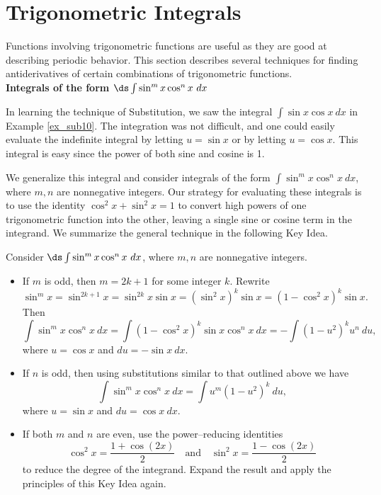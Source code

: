 \pagebreak
\section{Trigonometric Integrals}\label{sec:trigint}
Functions involving trigonometric functions are useful as they are good at describing periodic behavior. %
 This section describes several techniques for finding antiderivatives of certain combinations of trigonometric functions.\\

\noindent\textbf{\large Integrals of the form $\ds \int \sin^m x\cos^n x\ dx$}

In learning the technique of Substitution, we saw the integral $\int \sin x\cos x\ dx$ in Example \ref{ex_sub10}. The integration was not difficult, and one could easily evaluate the indefinite integral by letting $u=\sin x$ or by letting $u = \cos x$. This integral is easy since the power of both sine and cosine is 1.

We generalize this integral and consider integrals of the form $\int \sin^mx\cos^nx\ dx$, where $m,n$ are nonnegative integers. Our strategy for evaluating these integrals is to use the identity $\cos^2x+\sin^2x=1$ to convert high powers of one trigonometric function into the other, leaving a single sine or cosine term in the integrand. We summarize the general technique in the following Key Idea.

\enlargethispage{2\baselineskip}
\setboxwidth{60pt}
\noindent\ifthenelse{\isodd{\thepage}}{}{\hskip -60pt}
\begin{minipage}{\specialboxlength}
{Consider $\ds \int \sin^mx\cos^nx\ dx$, where $m,n$ are nonnegative integers.
	\begin{itemize}
	\item		If $m$ is odd, then $m=2k+1$ for some integer $k$. Rewrite \small
			$$ \sin^mx = \sin^{2k+1}x = \sin^{2k}x\sin x = (\sin^2x)^k\sin x = (1-\cos^2x)^k\sin x.$$\normalsize
			Then \small
			$$\int \sin^mx\cos^nx\ dx = \int (1-\cos^2x)^k\sin x\cos^nx\ dx = -\int (1-u^2)^ku^n\ du,$$\normalsize
			where $u = \cos x$ and $du = -\sin x\ dx$. 
	\item		If $n$ is odd, then using substitutions similar to that outlined above we have
			\small
			$$ \int \sin^mx\cos^nx\ dx = \int u^m(1-u^2)^k\ du,$$ \normalsize
			where $u = \sin x$ and $du = \cos x\ dx$.
	\item		If both $m$ and $n$ are even, use the power--reducing identities
		\small$$  \cos^2x = \frac{1+\cos (2x)}{2} \quad \text{and}\quad \sin^2x = \frac{1-\cos(2x)}2$$\normalsize
	to reduce the degree of the integrand. Expand the result and apply the principles of this Key Idea again.
	\end{itemize}
}
\end{minipage}
\restoreboxwidth

